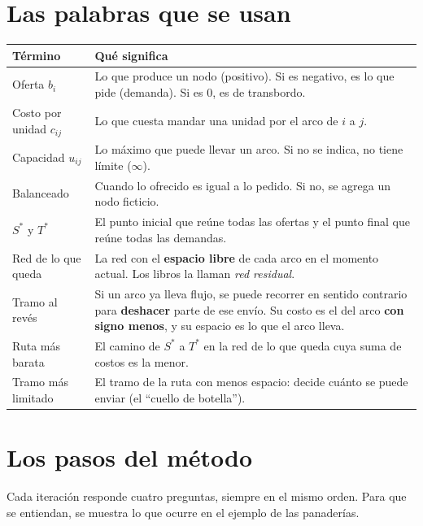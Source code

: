 \documentclass[11pt,a4paper]{article}
\newcommand{\Sini}{\ensuremath{S^{*}}}
\newcommand{\Tfin}{\ensuremath{T^{*}}}
\begin{document}
\section{Las palabras que se usan}

\begin{center}\small
\begin{tabular}{p{3.6cm}p{10.6cm}}
\toprule
\textbf{Término} & \textbf{Qué significa} \\
\midrule
Oferta $b_i$ & Lo que produce un nodo (positivo). Si es negativo, es lo que pide (demanda). Si es 0, es de transbordo. \\
Costo por unidad $c_{ij}$ & Lo que cuesta mandar una unidad por el arco de $i$ a $j$. \\
Capacidad $u_{ij}$ & Lo máximo que puede llevar un arco. Si no se indica, no tiene límite ($\infty$). \\
Balanceado & Cuando lo ofrecido es igual a lo pedido. Si no, se agrega un nodo ficticio. \\
\Sini{} y \Tfin & El punto inicial que reúne todas las ofertas y el punto final que reúne todas las demandas. \\
Red de lo que queda & La red con el \textbf{espacio libre} de cada arco en el momento actual. Los libros la llaman
                      \emph{red residual}. \\
Tramo al revés & Si un arco ya lleva flujo, se puede recorrer en sentido contrario para \textbf{deshacer} parte de ese
                 envío. Su costo es el del arco \textbf{con signo menos}, y su espacio es lo que el arco lleva. \\
Ruta más barata & El camino de \Sini{} a \Tfin{} en la red de lo que queda cuya suma de costos es la menor. \\
Tramo más limitado & El tramo de la ruta con menos espacio: decide cuánto se puede enviar (el ``cuello de botella''). \\
\bottomrule
\end{tabular}
\end{center}

\section{Los pasos del método}\label{sec:algoritmo}

Cada iteración responde cuatro preguntas, siempre en el mismo orden. Para que se entiendan, se muestra lo que
ocurre en el ejemplo de las panaderías.
\end{document}
